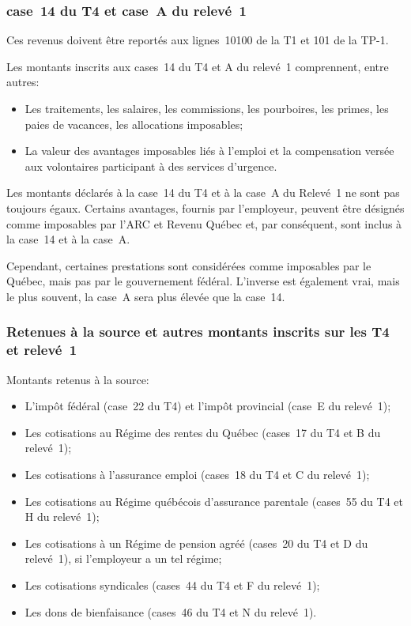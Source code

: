 \subsubsection{case~14 du T4 et case~A du relevé~1}
Ces revenus doivent être reportés aux lignes~10100 de la T1 et 101 de la TP-1.

Les montants inscrits aux cases~14 du T4 et A du relevé~1 comprennent, entre
autres:
\begin{itemize}
	\item Les traitements, les salaires, les commissions, les pourboires, les primes, les paies de vacances, les allocations imposables;
	\item La valeur des avantages imposables liés à l'emploi et la compensation versée aux volontaires participant à des services d'urgence.
\end{itemize}

\begin{note}
	Les montants déclarés à la case~14 du T4 et à la case~A du Relevé~1 ne sont pas toujours égaux. Certains avantages, fournis par l'employeur, peuvent être désignés comme imposables par l'ARC et Revenu Québec et, par conséquent, sont inclus à la case~14 et à la case~A.
	
	Cependant, certaines prestations sont considérées comme imposables par le Québec, mais pas par le gouvernement fédéral. L'inverse est également vrai, mais le plus souvent, la case~A sera plus élevée que la case~14.
\end{note}

\subsubsection{Retenues à la source et autres montants inscrits sur les T4 et relevé~1}
Montants retenus à la source:
\begin{itemize}
	\item L'impôt fédéral (case~22 du T4) et l'impôt provincial (case~E du relevé~1);
	\item Les cotisations au Régime des rentes du Québec (cases~17 du T4 et B du relevé~1);
	\item Les cotisations à l'assurance emploi (cases~18 du T4 et C du relevé~1);
	\item Les cotisations au Régime québécois d'assurance parentale (cases~55 du T4 et H du relevé~1);
	\item Les cotisations à un Régime de pension agréé (cases~20 du T4 et D du relevé~1), si l'employeur a un tel régime;
	\item Les cotisations syndicales (cases~44 du T4 et F du relevé~1);
	\item Les dons de bienfaisance (cases~46 du T4 et N du relevé~1).
\end{itemize}

